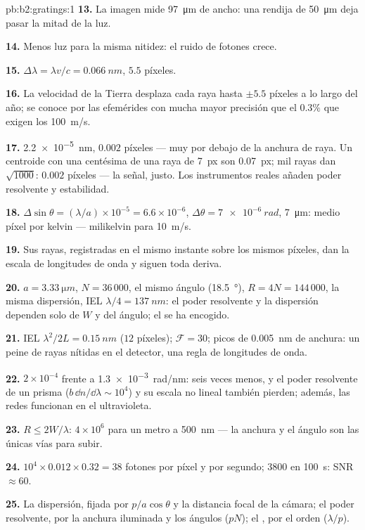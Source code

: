 \begin{solution}{pb:b2:gratings:1}
\textbf{13.} La imagen mide \qty{97}{\micro m} de ancho: una rendija de \qty{50}{\micro m} deja pasar
la mitad de la luz.

\textbf{14.} Menos luz para la misma nitidez: el ruido de fotones crece.

\textbf{15.} $\Delta\lambda = \lambda v/c = \qty{0.066}{nm}$, $5.5$ píxeles.

\textbf{16.} La velocidad de la Tierra desplaza cada raya hasta $\pm5.5$
píxeles a lo largo del año; se conoce por las efemérides con mucha
mayor precisión que el $0.3\%$ que exigen los \qty{100}{m/s}.

\textbf{17.} \qty{2.2e-5}{nm}, $0.002$ píxeles --- muy por debajo de la anchura de raya. Un
centroide con una centésima de una raya de \qty{7}{px} son \qty{0.07}{px}; mil
rayas dan $\sqrt{1000}$: $0.002$ píxeles --- la señal, justo. Los instrumentos
reales añaden poder resolvente y estabilidad.

\textbf{18.} $\Delta\sin\theta = (\lambda/a) \times 10^{-5} = 6.6 \times 10^{-6}$, $\Delta\theta = \qty{7e-6}{rad}$,
\qty{7}{\micro m}: medio píxel por kelvin --- milikelvin para \qty{10}{m/s}.

\textbf{19.} Sus rayas, registradas en el mismo instante sobre los mismos
píxeles, dan la escala de longitudes de onda y siguen toda deriva.

\textbf{20.} $a = \qty{3.33}{\micro m}$, $N = 36\,000$, el mismo ángulo (\qty{18.5}{\degree}), $R = 4N
= 144\,000$, la misma dispersión, IEL $\lambda/4 = \qty{137}{nm}$: el poder resolvente y la
dispersión dependen solo de $W$ y del ángulo; el 
se ha encogido.

\textbf{21.} IEL $\lambda^2/2L = \qty{0.15}{nm}$ ($12$ píxeles); $\mathcal F = 30$; picos de
\qty{0.005}{nm} de anchura: un peine de rayas nítidas en el detector, una
regla de longitudes de onda.

\textbf{22.} $2 \times 10^{-4}$ frente a \qty{1.3e-3}{rad/nm}: seis veces menos, y el
poder resolvente de un prisma ($b\,\dd n/\dd\lambda \sim 10^4$) y su escala no lineal
también pierden; además, las redes funcionan en el ultravioleta.

\textbf{23.} $R \le 2W/\lambda$: $4 \times 10^6$ para un metro a \qty{500}{nm} --- la anchura y
el ángulo son las únicas vías para subir.

\textbf{24.} $10^4 \times 0.012 \times 0.32 = 38$ fotones por píxel y por segundo; $3800$
en \qty{100}{s}: SNR $\approx 60$.

\textbf{25.} La dispersión, fijada por $p/a\cos\theta$ y la distancia focal de la cámara;
el poder resolvente, por la anchura iluminada y los ángulos ($pN$);
el , por el orden ($\lambda/p$).
\end{solution}
